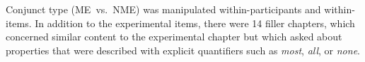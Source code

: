 \documentclass[10pt,letterpaper]{article}
\newcommand{\red}[1]{{\textcolor{Red}{#1}}}
\begin{document}
Conjunct type (ME~vs.~NME) was manipulated within-participants and within-items. 
In addition to the experimental items, there were 14 filler chapters, which concerned similar content to the experimental chapter but which asked about properties that were described with explicit quantifiers such as \emph{most}, \emph{all}, or \emph{none}. 






\end{document}
